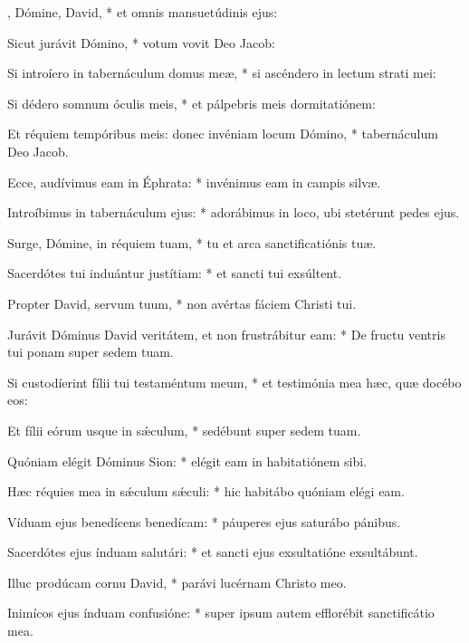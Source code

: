 \begin{psalmus}

    , Dómine, David, * et omnis mansuetúdinis ejus:

    Sicut jurávit Dómino, * votum vovit Deo Jacob:

    Si introíero in tabernáculum domus meæ, * si ascéndero in lectum strati mei:

    Si dédero somnum óculis meis, * et pálpebris meis dormitatiónem:

    Et réquiem tempóribus meis: donec invéniam locum Dómino, * tabernáculum Deo Jacob.

    Ecce, audívimus eam in Éphrata: * invénimus eam in campis silvæ.

    Introíbimus in tabernáculum ejus: * adorábimus in loco, ubi stetérunt pedes ejus.

    Surge, Dómine, in réquiem tuam, * tu et arca sanctificatiónis tuæ.

    Sacerdótes tui induántur justítiam: * et sancti tui exsúltent.

    Propter David, servum tuum, * non avértas fáciem Christi tui.

    Jurávit Dóminus David veritátem, et non frustrábitur eam: * De fructu ventris tui ponam super sedem tuam.

    Si custodíerint fílii tui testaméntum meum, * et testimónia mea hæc, quæ docébo eos:

    Et fílii eórum usque in sǽculum, * sedébunt super sedem tuam.

    Quóniam elégit Dóminus Sion: * elégit eam in habitatiónem sibi.

    Hæc réquies mea in sǽculum sǽculi: * hic habitábo quóniam elégi eam.

    Víduam ejus benedícens benedícam: * páuperes ejus saturábo pánibus.

    Sacerdótes ejus índuam salutári: * et sancti ejus exsultatióne exsultábunt.

    Illuc prodúcam cornu David, * parávi lucérnam Christo meo.

    Inimícos ejus índuam confusióne: * super ipsum autem efflorébit sanctificátio mea.

\end{psalmus}
